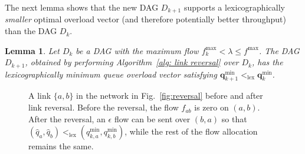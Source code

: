 \documentclass{sig-alternate-2013}
\newtheorem{lemma}{Lemma}
\newcommand{\lex}{\operatorname{lex}}
\begin{document}
The next lemma shows that the new DAG $D_{k+1}$ supports a lexicographically \emph{smaller} optimal overload vector (and therefore potentially better throughput) than the DAG $D_{k}$.
\begin{lemma} \label{lem: monotonicity}
Let $D_k$ be a DAG with the maximum flow $f_{k}^{\max} < \lambda \le f^{\max}$. The DAG $D_{k+1}$, obtained by performing  Algorithm~\ref{alg: link reversal} over $D_{k}$, has the lexicographically minimum queue overload vector satisfying $\bm{q}_{k+1}^{\text{min}} <_{\lex} \bm{q}_{k}^{\text{min}}$.
\end{lemma}
\begin{figure}[h]
\centering
{}

\caption{A link $\{a, b\}$ in the network in Fig.~\ref{fig:reversal} before and after link reversal. Before the reversal, the flow $f_{ab}$ is zero on $(a, b)$.  After the reversal, an $\epsilon$ flow can be sent over $(b, a)$ so that $(\widehat{q}_a, \widehat{q}_b) <_{\lex} (q_{k,a}^{\min}, q_{k, b}^{\min})$, while the rest of the flow allocation remains the same.}
\label{fig: monotonicity}
\end{figure}
\end{document}
